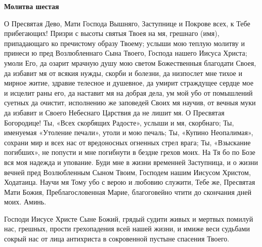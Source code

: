 \medskip\bfseries Молитва шестая\normalfont{}\nopagebreak


О Пресвятая Дево, Мати Господа Вышняго, Заступнице и Покрове всех, к Тебе прибегающих! Призри с высоты святыя Твоея на мя, грешнаго (имя), припадающаго ко пречистому образу Твоему; услыши мою теплую молитву и принеси ю пред Возлюбленнаго Сына Твоего, Господа нашего Иисуса Христа; умоли Его, да озарит мрачную душу мою светом Божественныя благодати Своея, да избавит мя от всякия нужды, скорби и болезни, да низпослет мне тихое и мирное житие, здравие телесное и душевное, да умирит страждущее сердце мое и исцелит раны его, да наставит мя на добрая дела, ум мой убо от помышлений суетных да очистит, исполнению же заповедей Своих мя научив, от вечныя муки да избавит и Своего Небеснаго Царствия да не лишит мя. О Пресвятая Богородице! Ты, «Всех скорбящих Радосте», услыши и мя, скорбнаго; Ты, именуемая «Утоление печали», утоли и мою печаль; Ты, «Купино Неопалимая», сохрани мир и всех нас от вредоносных огненных стрел врага; Ты, «Взыскание погибших», не попусти и мне погибнути в бездне грехов моих. На Тя бо по Бозе вся моя надежда и упование. Буди мне в жизни временней Заступница, и о жизни вечней пред Возлюбленным Сыном Твоим, Господем нашим Иисусом Христом, Ходатаица. Научи мя Тому убо с верою и любовию служити, Тебе же, Пресвятая Мати Божия, Преблагословенная Марие, благоговейно чтити до скончания дней моих. Аминь.


\bigskip\mychapterending

 


Господи Иисусе Христе Сыне Божий, грядый судити живых и мертвых помилуй нас, грешных, прости грехопадения всей нашей жизни, и имиже веси судьбами сокрый нас от лица антихриста в сокровенной пустыне спасения Твоего.
\mychapterending

